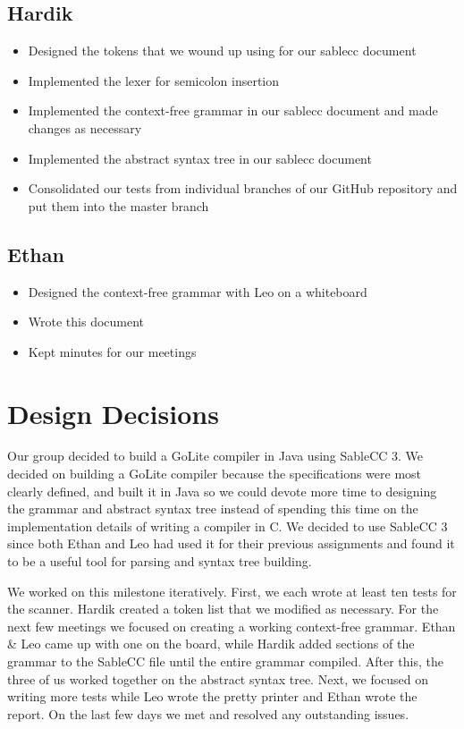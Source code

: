 \documentclass{article}
\begin{document}
\subsection*{Hardik}
\begin{itemize}
    \item Designed the tokens that we wound up using for our sablecc document
    \item Implemented the lexer for semicolon insertion
    \item Implemented the context-free grammar in our sablecc document and made changes as necessary
    \item Implemented the abstract syntax tree in our sablecc document
    \item Consolidated our tests from individual branches of our GitHub repository and put them into the master branch
\end{itemize}


\subsection*{Ethan}

\begin{itemize}
    \item Designed the context-free grammar with Leo on a whiteboard
    \item Wrote this document
    \item Kept minutes for our meetings
\end{itemize}

\section*{Design Decisions}

Our group decided to build a GoLite compiler in Java using SableCC 3. We decided on building a GoLite compiler because the specifications were most clearly defined, and built it in Java so we could devote more time to designing the grammar and abstract syntax tree instead of spending this time on the implementation details of writing a compiler in C. We decided to use SableCC 3 since both Ethan and Leo had used it for their previous assignments and found it to be a useful tool for parsing and syntax tree building.

We worked on this milestone iteratively. First, we each wrote at least ten tests for the scanner. Hardik created a token list that we modified as necessary. For the next few meetings we focused on creating a working context-free grammar. Ethan \& Leo came up with one on the board, while Hardik added sections of the grammar to the SableCC file until the entire grammar compiled. After this, the three of us worked together on the abstract syntax tree. Next, we focused on writing more tests while Leo wrote the pretty printer and Ethan wrote the report. On the last few days we met and resolved any outstanding issues.
\end{document}
